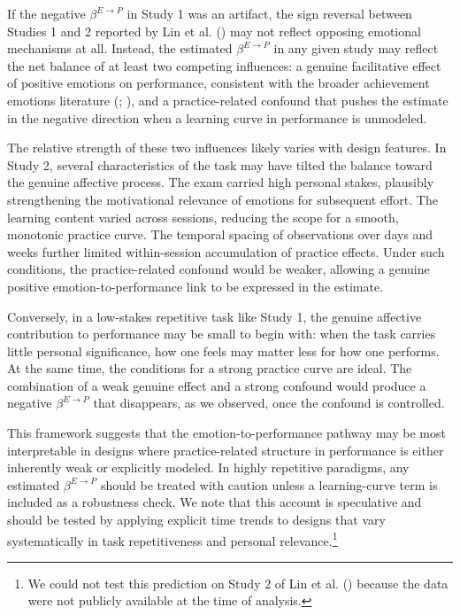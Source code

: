 \documentclass[
  man,
  floatsintext,
  longtable,
  nolmodern,
  notxfonts,
  notimes,
  colorlinks=true,linkcolor=blue,citecolor=blue,urlcolor=blue]{apa7}
\begin{document}
If the negative \(\beta^{E \to P}\) in Study 1 was an artifact, the sign
reversal between Studies 1 and 2 reported by Lin et al.
() may not reflect opposing emotional
mechanisms at all. Instead, the estimated \(\beta^{E \to P}\) in any
given study may reflect the net balance of at least two competing
influences: a genuine facilitative effect of positive emotions on
performance, consistent with the broader achievement emotions literature
(;
), and a practice-related
confound that pushes the estimate in the negative direction when a
learning curve in performance is unmodeled.

The relative strength of these two influences likely varies with design
features. In Study 2, several characteristics of the task may have
tilted the balance toward the genuine affective process. The exam
carried high personal stakes, plausibly strengthening the motivational
relevance of emotions for subsequent effort. The learning content varied
across sessions, reducing the scope for a smooth, monotonic practice
curve. The temporal spacing of observations over days and weeks further
limited within-session accumulation of practice effects. Under such
conditions, the practice-related confound would be weaker, allowing a
genuine positive emotion-to-performance link to be expressed in the
estimate.

Conversely, in a low-stakes repetitive task like Study 1, the genuine
affective contribution to performance may be small to begin with: when
the task carries little personal significance, how one feels may matter
less for how one performs. At the same time, the conditions for a strong
practice curve are ideal. The combination of a weak genuine effect and a
strong confound would produce a negative \(\beta^{E \to P}\) that
disappears, as we observed, once the confound is controlled.

This framework suggests that the emotion-to-performance pathway may be
most interpretable in designs where practice-related structure in
performance is either inherently weak or explicitly modeled. In highly
repetitive paradigms, any estimated \(\beta^{E \to P}\) should be
treated with caution unless a learning-curve term is included as a
robustness check. We note that this account is speculative and should be
tested by applying explicit time trends to designs that vary
systematically in task repetitiveness and personal relevance.\footnote{We
  could not test this prediction on Study 2 of Lin et al.
  () because the data were not
  publicly available at the time of analysis.}
\end{document}
